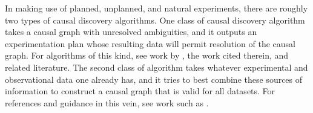 In making use of planned, unplanned, and natural experiments, there are roughly two types of causal discovery algorithms.
One class of causal discovery algorithm takes a causal graph with unresolved ambiguities, and it outputs an experimentation plan whose resulting data will permit resolution of the causal graph.
For algorithms of this kind, see work by \citet{ghassami_2018_budgeted}, the work cited therein, and related literature.
The second class of algorithm takes whatever experimental and observational data one already has, and it tries to best combine these sources of information to construct a causal graph that is valid for all datasets.
For references and guidance in this vein, see work such as \citet{tian_2013_causal, peters_2016_causal, ghassami_2017_learning, kallus_2018_removing}.
